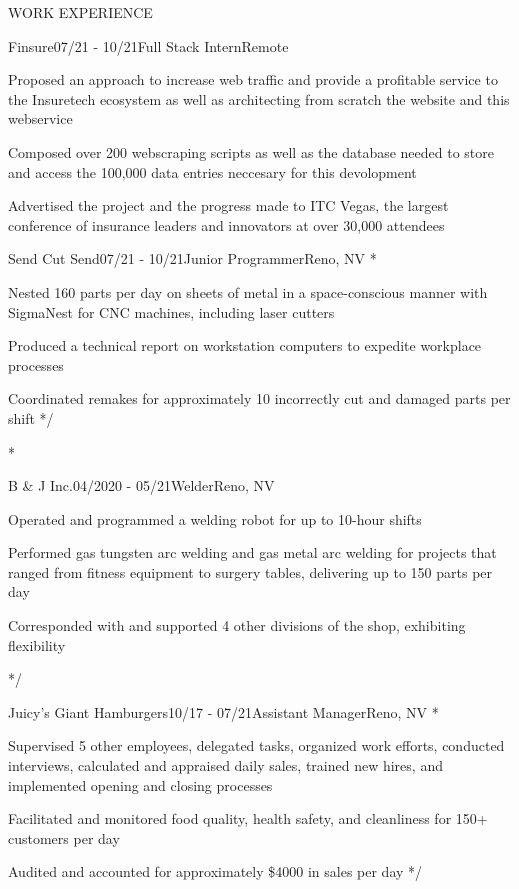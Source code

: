 \documentclass{resume} %
\begin{document}
\begin{rSection}{WORK EXPERIENCE}

	\begin{rSubsection}{Finsure}{07/21 - 10/21}{Full Stack Intern}{Remote}
		\item Proposed an approach to increase web traffic and provide a profitable service to the Insuretech 
		ecosystem as well as architecting from scratch the website and this webservice
		\item Composed over 200 webscraping scripts as well as the database needed to store and access the 100,000 data entries neccesary for this devolopment
		\item Advertised the project and the progress made to ITC Vegas, the largest conference of insurance leaders and innovators at over 30,000 attendees
	\end{rSubsection}

	\begin{emptyrSubsection}{Send Cut Send}{07/21 - 10/21}{Junior Programmer}{Reno, NV}
		\/*
		\item Nested 160 parts per day on sheets of metal in a space-conscious manner with SigmaNest for CNC machines,
		including laser cutters
		\item Produced a technical report on workstation computers to expedite workplace processes
		\item Coordinated remakes for approximately 10 incorrectly cut and damaged parts per shift
		*/
	\end{emptyrSubsection}

	\/*
	\begin{rSubsection}{B \& J Inc.}{04/2020 - 05/21}{Welder}{Reno, NV}
		\item Operated and programmed a welding robot for up to 10-hour shifts
		\item Performed gas tungsten arc welding and gas metal arc welding for projects that ranged from fitness equipment to surgery tables, delivering up to 150 parts per day
		\item Corresponded with and supported 4 other divisions of the shop, exhibiting flexibility
	\end{rSubsection}
	*/

	\begin{emptyrSubsection}{Juicy's Giant Hamburgers}{10/17 - 07/21}{Assistant Manager}{Reno, NV}
		\/*
		\item Supervised 5 other employees, delegated tasks, organized work efforts, conducted interviews, calculated and
		appraised daily sales, trained new hires, and implemented opening and closing processes
		\item Facilitated and monitored food quality, health safety, and cleanliness for 150+ customers per day
		\item Audited and accounted for approximately \$4000 in sales per day
		*/
	\end{emptyrSubsection}

\end{rSection}
\end{document}
